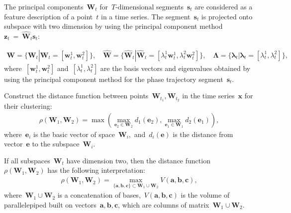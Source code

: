 \documentclass[12pt, twoside]{article}
\numberwithin{equation}{section}
\begin{document}

The principal components~$\textbf{W}_t$ for~$T\text{-dimensional}$ segments~$\textbf{s}_t$ are considered as a feature description of a point~$t$ in a time series. The segment~$\textbf{s}_t $ is projected onto subspace with two dimension by using the principal component method~$\textbf{z}_t~=~\hat{\textbf{W}}_t\textbf{s}_t$:

\begin{equation}
\label{eq:cl:3}
\begin{aligned}
\mathbf{W} = \{\textbf{W}_t| \textbf{W}_t = [\textbf{w}^1_t, \textbf{w}^2_t]\}, \quad \hat{\mathbf{W}} = \{\hat{\textbf{W}}_t| \hat{\textbf{W}}_t = [\lambda^1_t\textbf{w}^1_t, \lambda^2_t\textbf{w}^2_t]\}, \quad \bm{\Lambda} = \{\bm{\lambda}_t| \bm{\lambda}_t=[\lambda^1_t, \lambda^2_t]\},
\end{aligned}
\end{equation}
where~$[\textbf{w}^1_t, \textbf{w}^2_t]$ and~$[\lambda^1_t, \lambda^2_t]$ are the basis vectors and eigenvalues obtained by using the principal component method for the phase trajectory segment~$\textbf{s}_t$.



Construct the distance function between points~$\mathbf{W}_{t_1},\mathbf{W}_{t_2}$ in the time series~$\textbf{x}$ for their clustering:
\begin{equation}
\label{eq:cl:4}
\begin{aligned}
\rho\left(\textbf{W}_1, \textbf{W}_2\right) = \max\left(\max_{\textbf{e}_2 \in \textbf{W}_2} d_{1}\left(\textbf{e}_2\right), \max_{\textbf{e}_1 \in \textbf{W}_1} d_{2}\left(\textbf{e}_1\right)\right),
\end{aligned}
\end{equation}
where~$\textbf{e}_i$ is the basic vector of space~$\textbf{W}_i,$ and~$d_i\left(\textbf{e}\right)$ is the distance from vector~$\textbf{e}$ to the subspace~$\textbf{W}_i$.

If all subspaces~$\textbf{W}_t$ have dimension two, then the distance function~$\rho\left(\textbf{W}_1, \textbf{W}_2\right)$ has the following interpretation:
\begin{equation}
\label{eq:cl:5}
\begin{aligned}
\rho\left(\textbf{W}_1, \textbf{W}_2\right) = \max_{\{\textbf{a},\textbf{b},\textbf{c}\} \subset \textbf{W}_1\cup \textbf{W}_2 } V\left(\textbf{a},\textbf{b},\textbf{c}\right), 
\end{aligned}
\end{equation}
where~$\textbf{W}_1\cup\textbf{W}_2$ is a concatenation of bases,~$V\left(\textbf{a},\textbf{b},\textbf{c}\right)$ is the volume of parallelepiped built on vectors~$\textbf{a}, \textbf{b}, \textbf{c}$, which are columns of matrix~$\textbf{W}_1\cup\textbf{W}_2$.
\end{document}
